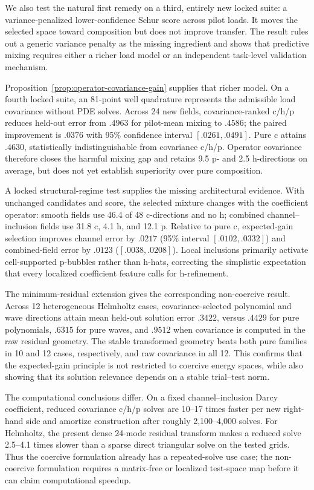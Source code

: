 \documentclass[11pt]{article}
\numberwithin{algorithm}{section}
\theoremstyle{definition}\newtheorem{definition}[theorem]{Definition}
\theoremstyle{remark}\newtheorem{remark}[theorem]{Remark}
\begin{document}
We also test the natural first remedy on a third, entirely new locked suite: a
variance-penalized lower-confidence Schur score across pilot loads.  It moves
the selected space toward composition but does not improve transfer.  The
result rules out a generic variance penalty as the missing ingredient and
shows that predictive mixing requires either a richer load model or an
independent task-level validation mechanism.

Proposition~\ref{prop:operator-covariance-gain} supplies that richer model.
On a fourth locked suite, an 81-point well quadrature represents the admissible
load covariance without PDE solves.  Across 24 new fields, covariance-ranked
c/h/p reduces held-out error from $.4963$ for pilot-mean mixing to $.4586$;
the paired improvement is $.0376$ with 95\% confidence interval
$[.0261,.0491]$.  Pure c attains $.4630$, statistically indistinguishable
from covariance c/h/p.  Operator covariance therefore closes the harmful
mixing gap and retains 9.5 p- and 2.5 h-directions on average, but does not yet
establish superiority over pure composition.

A locked structural-regime test supplies the missing architectural evidence.
With unchanged candidates and score, the selected mixture changes with the
coefficient operator: smooth fields use 46.4 of 48 c-directions and no h;
combined channel--inclusion fields use 31.8 c, 4.1 h, and 12.1 p.  Relative to
pure c, expected-gain selection improves channel error by $.0217$ (95\%
interval $[.0102,.0332]$) and combined-field error by $.0123$
($[.0038,.0208]$).  Local inclusions primarily activate cell-supported
p-bubbles rather than h-hats, correcting the simplistic expectation that
every localized coefficient feature calls for h-refinement.

The minimum-residual extension gives the corresponding non-coercive result.
Across 12 heterogeneous Helmholtz cases, covariance-selected polynomial and
wave directions attain mean held-out solution error $.3422$, versus $.4429$
for pure polynomials, $.6315$ for pure waves, and $.9512$ when covariance is
computed in the raw residual geometry.  The stable transformed geometry beats
both pure families in 10 and 12 cases, respectively, and raw covariance in all
12.  This confirms that the expected-gain principle is not restricted to
coercive energy spaces, while also showing that its solution relevance depends
on a stable trial--test norm.

The computational conclusions differ.  On a fixed channel--inclusion Darcy
coefficient, reduced covariance c/h/p solves are 10--17 times faster per new
right-hand side and amortize construction after roughly 2,100--4,000 solves.
For Helmholtz, the present dense 24-mode residual transform makes a reduced
solve 2.5--4.1 times slower than a sparse direct triangular solve on the tested
grids.  Thus the coercive formulation already has a repeated-solve use case;
the non-coercive formulation requires a matrix-free or localized test-space
map before it can claim computational speedup.
\endsecondarynumericsF
\end{document}
